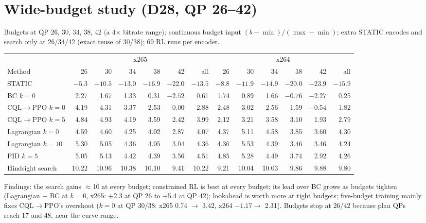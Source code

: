 \documentclass[10pt,a4paper]{article}
\begin{document}
\section{Wide-budget study (D28, QP 26--42)}
Budgets at QP 26, 30, 34, 38, 42 (a 4$\times$ bitrate range); continuous budget input
$(b-\min)/(\max-\min)$; extra STATIC encodes and search only at 26/34/42 (exact reuse of 30/38); 69 RL runs per encoder.
\begin{center}\small
\begin{tabular}{lrrrrrr|rrrrrr}
\toprule
& \multicolumn{6}{c|}{x265} & \multicolumn{6}{c}{x264}\\
Method & 26 & 30 & 34 & 38 & 42 & all & 26 & 30 & 34 & 38 & 42 & all \\\midrule
STATIC & $-5.3$ & $-10.5$ & $-13.0$ & $-16.9$ & $-22.0$ & $-13.5$ & $-8.8$ & $-11.9$ & $-14.9$ & $-20.0$ & $-23.9$ & $-15.9$ \\
BC $k=0$ & 2.27 & 1.67 & 1.33 & 0.31 & $-2.52$ & 0.61 & 1.74 & 0.89 & 1.66 & $-0.76$ & $-2.27$ & 0.25 \\
CQL$\to$PPO $k=0$ & 4.19 & 4.31 & 3.37 & 2.53 & 0.00 & 2.88 & 2.48 & 3.02 & 2.56 & 1.59 & $-0.54$ & 1.82 \\
CQL$\to$PPO $k=5$ & 4.84 & 4.93 & 4.19 & 3.59 & 2.42 & 3.99 & 2.12 & 3.21 & 3.58 & 3.10 & 1.93 & 2.79 \\
Lagrangian $k=0$ & 4.59 & 4.60 & 4.25 & 4.02 & 2.87 & 4.07 & 4.37 & 5.11 & 4.58 & 3.85 & 3.60 & 4.30 \\
Lagrangian $k=10$ & 5.30 & 5.05 & 4.36 & 4.05 & 3.04 & 4.36 & 4.36 & 5.53 & 4.39 & 3.46 & 3.46 & 4.24 \\
PID $k=5$ & 5.05 & 5.13 & 4.42 & 4.39 & 3.56 & 4.51 & 4.85 & 5.28 & 4.49 & 3.74 & 2.92 & 4.26 \\
Hindsight search & 10.22 & 10.96 & 10.38 & 10.10 & 9.41 & 10.22 & 9.21 & 10.04 & 10.03 & 9.86 & 9.88 & 9.80 \\
\bottomrule
\end{tabular}
\end{center}
Findings: the search gains $\approx$10 at every budget; constrained RL is best at every budget; its lead over BC grows
as budgets tighten (Lagrangian $-$ BC at $k=0$, x265: +2.3 at QP 26 to +5.4 at QP 42); lookahead is worth more at tight
budgets; five-budget training mainly fixes CQL$\to$PPO's overshoot ($k=0$ at QP 30/38: x265 0.74 $\to$ 3.42, x264
$-1.17\to$ 2.31). Budgets stop at 26/42 because plan QPs reach 17 and 48, near the curve range.
\end{document}
